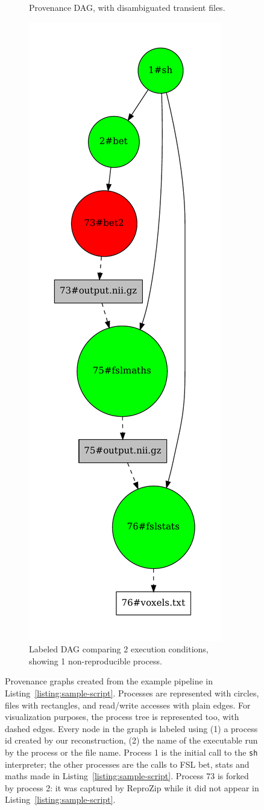\documentclass[a4paper,num-refs]{oup-contemporary}
\newcommand{\reprozip}[0]{ReproZip\xspace}
\begin{document}
\begin{figure}
\begin{subfigure}[t]{0.3\linewidth}
    \caption{Provenance DAG, with disambiguated transient files.}
    \label{fig:provenance-dag}
  \end{subfigure}
  \hfill
  \begin{subfigure}[t]{0.3\linewidth}
      \centering
      \includegraphics[width=.4\linewidth]{images/p-graph-dag-labelled.pdf}
     \caption{Labeled DAG comparing 2 execution conditions, showing 1 non-reproducible process.}
     \label{fig:labeled-dag} 
  \end{subfigure}
    \caption{Provenance graphs
    created from the example pipeline in
    Listing~\ref{listing:sample-script}.
    Processes are represented with circles, files with rectangles, and read/write accesses 
    with plain edges. 
    For visualization purposes, the process tree is represented too, with
    dashed edges. Every node in the graph is labeled using (1) a process id
    created by our reconstruction, (2) the name of the executable run by the
    process or the file name. Process 1 is the initial call to the
    \texttt{sh} interpreter; the other processes are the calls to FSL bet,
    stats and maths made in Listing~\ref{listing:sample-script}. Process 73
    is forked by process 2: it was captured by \reprozip while it did not
    appear in Listing~\ref{listing:sample-script}.
  }
    \label{fig:spot-example}
  \end{figure}
\end{document}
